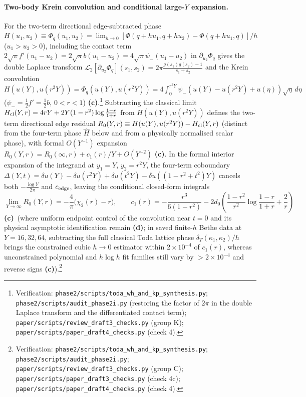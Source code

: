 \documentclass[11pt,a4paper]{article}
\newcommand{\lab}[1]{{\normalfont\sffamily\footnotesize\bfseries(#1)}}
\newcommand{\Lc}{\lab{c}}
\newcommand{\Ld}{\lab{d}}
\newcommand{\scr}[1]{\nolinkurl{#1}}
\newcommand{\chk}[1]{\footnote{\raggedright Verification: #1.}}
\theoremstyle{remark}
\begin{document}
\paragraph{Two-body Krein convolution and conditional large-$Y$ expansion.} For the two-term directional edge-subtracted phase $H(u_1,u_2)\equiv\Phi_q(u_1,u_2)=\lim_{h\to0}[\Phi(q+hu_1,q+hu_2)-\Phi(q+hu_1,q)]/h$ ($u_1>u_2>0$), including the contact term $2\sqrt\pi f'(u_1-u_2)=2\sqrt\pi b(u_1-u_2)=4\sqrt\pi\psi_-(u_1-u_2)$ in $\partial_{u_2}\Phi_q$ gives the double Laplace transform $\mathcal L_2[\partial_{u_2}\Phi_q](s_1,s_2)=2\pi\frac{g(s_1)g(s_2)-1}{s_1+s_2}$ and the Krein convolution $H(u(Y),u(r^2Y))=\Phi_q(u(Y),u(r^2Y))=4\int_0^{r^2Y}\psi_-(u(Y)-u(r^2Y)+u(\eta))\sqrt\eta\,d\eta$ ($\psi_-=\tfrac12f'=\tfrac12b$, $0<r<1$) \Lc.\chk{\scr{phase2/scripts/toda_wh_and_kp_synthesis.py}; \scr{phase2/scripts/audit_phase2i.py} (restoring the factor of $2\pi$ in the double Laplace transform and the differentiated contact term); \scr{paper/scripts/review_draft3_checks.py} (group K); \scr{paper/scripts/paper_draft4_checks.py} (check 4)}
Subtracting the classical limit $H_{\rm cl}(Y,r)=4rY+2Y(1-r^2)\log\frac{1-r}{1+r}$ from $H(u(Y),u(r^2Y))$ defines the two-term directional edge residual $R_0(Y,r)\equiv H(u(Y),u(r^2Y))-H_{\rm cl}(Y,r)$ (distinct from the four-term phase $\widehat H$ below and from a physically normalised scalar phase), with formal $O(Y^{-1})$ expansion $R_0(Y,r)=R_0(\infty,r)+c_1(r)/Y+O(Y^{-2})$ \Lc. In the formal interior expansion of the integrand at $y_1=Y$, $y_2=r^2Y$, the four-term coboundary $\Delta(Y,t)=\delta u(Y)-\delta u(r^2Y)+\delta u(t^2Y)-\delta u((1-r^2+t^2)Y)$ cancels both $-\frac{\log Y}{2\pi}$ and $c_{\rm edge}$, leaving the conditional closed-form integrals
\begin{equation}\label{eq:R0c1}
\lim_{Y\to\infty}R_0(Y,r)=-\frac4\pi\big(\chi_2(r)-r\big),\qquad
c_1(r)=-\frac{r^3}{6(1-r^2)}-2d_0\left(\frac{1-r^2}{r^2}\log\frac{1-r}{1+r}+\frac2r\right)
\end{equation}
\Lc\ (where uniform endpoint control of the convolution near $t=0$ and its physical asymptotic identification remain \Ld; in saved finite-$h$ Bethe data at $Y=16,32,64$, subtracting the full classical Toda lattice phase $\delta_T(\kappa_1,\kappa_2)/h$ brings the constrained cubic $h\to0$ estimator within $2\times10^{-4}$ of $c_1(r)$, whereas unconstrained polynomial and $h\log h$ fit families still vary by $>2\times10^{-4}$ and reverse signs \Lc).\chk{\scr{phase2/scripts/toda_wh_and_kp_synthesis.py}; \scr{phase2/scripts/audit_phase2i.py}; \scr{paper/scripts/review_draft3_checks.py} (group C); \scr{paper/scripts/paper_draft3_checks.py} (check 4c); \scr{paper/scripts/paper_draft4_checks.py} (check 4)}
\end{document}
